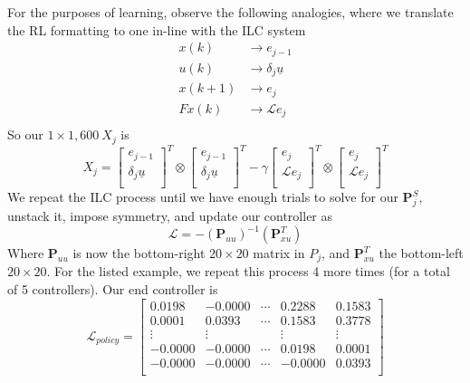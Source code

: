 For the purposes of learning, observe the following analogies, where we translate the RL formatting to one in-line with the ILC system
\begin{align}
    x\left(k\right)&\rightarrow e_{j-1}  \\
    u\left(k\right)&\rightarrow\delta_j\underline{u} \\
    x\left(k+1\right)&\rightarrow e_j    \\
    Fx\left(k\right)&\rightarrow\mathcal{L}e_j   \\
\end{align}
So our $1 \times1,600 \ X_j$ is 
\begin{equation}
    X_j={\left[\begin{matrix}e_{j-1}\\\delta_j\underline{u}\\\end{matrix}\right]}^T\otimes{\left[\begin{matrix}e_{j-1}\\\delta_j\underline{u}\\\end{matrix}\right]}^T-{\gamma\left[\begin{matrix}e_j\\\mathcal{L}e_j\\\end{matrix}\right]}^T\otimes{\left[\begin{matrix}e_j\\\mathcal{L}e_j\\\end{matrix}\right]}^T
\end{equation}
We repeat the ILC process until we have enough trials to solve for our $\textbf{P}_j^S$, unstack it, impose symmetry, and update our controller as
\begin{equation}
    \mathcal{L}=-{\left(\textbf{P}_{uu}\right)}^{-1}\left(\textbf{P}_{xu}^T\right)
\end{equation}
Where $\textbf{P}_{uu}$ is now the bottom-right $20\times20$ matrix in $P_j$, and $\textbf{P}_{xu}^T$ the bottom-left $20\times20$. For the listed example, we repeat this process 4 more times (for a total of 5 controllers). Our end controller is
\begin{equation}
    \mathcal{L}_{policy}=\left[\begin{matrix}0.0198&-0.0000&\cdots&0.2288&0.1583\\0.0001&0.0393&\cdots&0.1583&0.3778\\\vdots&\vdots&&\vdots&\vdots\\-0.0000&-0.0000&\cdots&0.0198&0.0001\\-0.0000&-0.0000&\cdots&-0.0000&0.0393\\\end{matrix}\right]
    \label{eq:rl_ilc_policy_controller}
\end{equation}
